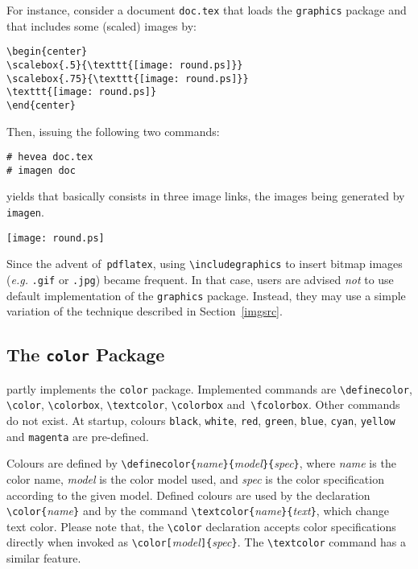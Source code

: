 For instance, consider a document \texttt{doc.tex} that
loads the \texttt{graphics} package and that includes some (scaled)
images by:
\begin{verbatim}
\begin{center}
\scalebox{.5}{\texttt{[image: round.ps]}}
\scalebox{.75}{\texttt{[image: round.ps]}}
\texttt{[image: round.ps]}
\end{center}
\end{verbatim}
Then, issuing the following two commands:
\begin{verbatim}
# hevea doc.tex
# imagen doc
\end{verbatim}
yields \html{} that basically consists in three image links,
the images being generated by \texttt{imagen}.
\ifhevea
\begin{htmlout}
\begin{center}
\texttt{[image: round.ps]}
\end{center}
\end{htmlout}
\fi
Since the advent of~\texttt{pdflatex},
using \verb+\includegraphics+ to insert bitmap images
(\emph{e.g.} \texttt{.gif} or \texttt{.jpg})
became frequent.
In that case, users are advised \emph{not} to use \hevea{} default
implementation of the \texttt{graphics} package.
Instead, they may use a simple variation of
the technique described in Section~\ref{imgsrc}.


\subsection{The \texttt{color} Package}%
\label{color}\label{color:package}%
\newcommand{\showcolor}[1]{\texttt{#1}}
\hevea{} partly implements the \texttt{color} package.
Implemented commands are \verb+\definecolor+, \verb+\color+,
\verb+\colorbox+,
\verb+\textcolor+, \verb+\colorbox+ and~\verb+\fcolorbox+.
Other commands do not exist.
At startup,
colours \showcolor{black}, \showcolor{white},
\showcolor{red}, \showcolor{green}, \showcolor{blue},
\showcolor{cyan}, \showcolor{yellow} and \showcolor{magenta} are
pre-defined.

%
Colours are defined by
\verb+\definecolor{+\textit{name}\verb+}{+\textit{model}\verb+}{+\textit{spec}\verb+}+,
where \textit{name} is the color name, \textit{model} is the color
model used, and \textit{spec} is the color specification according to
the given model.
Defined colours are used by the declaration
\verb+\color{+\textit{name}\verb+}+ and by the command
\verb+\textcolor{+\textit{name}\verb+}{+\textit{text}\verb+}+, which
change text color.
Please note that, the \verb+\color+ declaration
accepts color specifications directly
when invoked as
\verb+\color[+\textit{model}\verb+]{+\textit{spec}\verb+}+.
The \verb+\textcolor+ command has a similar feature.


